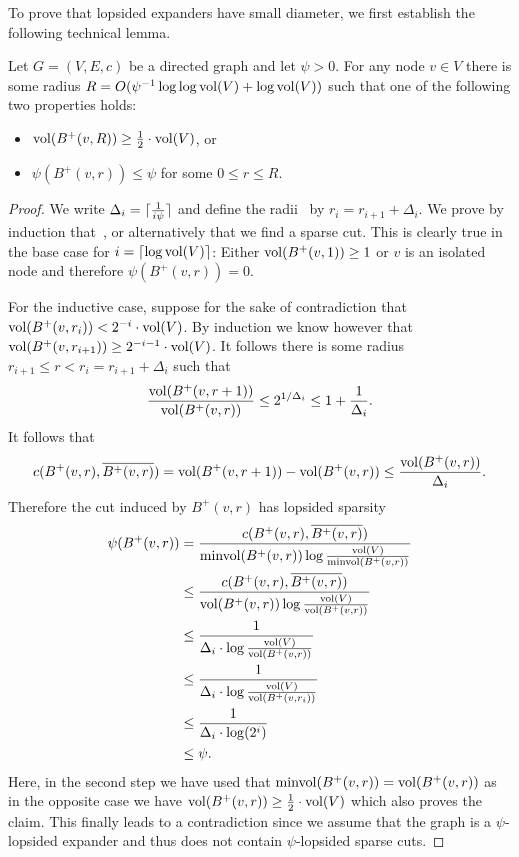 \documentclass[letterpaper,11pt]{article}
\begin{document}
To prove that lopsided expanders have small diameter, we first establish the following technical lemma. 

\begin{lemma} \label{lem:lopsided-expansion}
Let $G = (V, E, c)$ be a directed graph and let $\psi > 0$. For any node $v \in V$ there is some radius $R = O(\psi^{-1} \log\log \operatorname{vol}(V) + \log \operatorname{vol}(V))$ such that one of the following two properties holds:
\begin{itemize}
	\item $\operatorname{vol}(B^+(v, R)) \geq \frac{1}{2} \cdot \operatorname{vol}(V)$, or
	\item $\psi(B^+(v, r)) \leq \psi$ for some $0 \leq r \leq R$.
\end{itemize}
\end{lemma}
\begin{proof}
We write $\Delta_i = \lceil\frac{1}{i \psi}\rceil$ and define the radii~ by $r_i = r_{i+1} + \Delta_i$. We prove by induction that~, or alternatively that we find a sparse cut. This is clearly true in the base case for $i = \lceil\log \operatorname{vol}(V)\rceil$: Either $\operatorname{vol}(B^+(v, 1)) \geq 1$ or $v$ is an isolated node and therefore $\psi(B^+(v, r)) = 0$.

For the inductive case, suppose for the sake of contradiction that $\operatorname{vol}(B^+(v, r_i)) < 2^{-i} \cdot \operatorname{vol}(V)$. By induction we know however that $\operatorname{vol}(B^+(v, r_{i+1})) \geq 2^{-i-1} \cdot \operatorname{vol}(V)$. It follows there is some radius $r_{i+1} \leq r < r_i = r_{i+1} + \Delta_i$ such that
\begin{equation*}
	\frac{\operatorname{vol}(B^+(v, r + 1))}{\operatorname{vol}(B^+(v, r))} \leq 2^{1/\Delta_i} \leq 1 + \frac{1}{\Delta_i}.
\end{equation*}
It follows that
\begin{equation*}
	c(B^+(v, r), \overline{B^+(v, r)}) = \operatorname{vol}(B^+(v, r + 1)) - \operatorname{vol}(B^+(v, r)) \leq \frac{\operatorname{vol}(B^+(v, r))}{\Delta_i}.
\end{equation*}
Therefore the cut induced by $B^+(v, r)$ has lopsided sparsity
\begin{align*}
	\psi(B^+(v, r)) &= \frac{c(B^+(v, r), \overline{B^+(v, r)})}{\operatorname{minvol}(B^+(v, r)) \log \frac{\operatorname{vol}(V)}{\operatorname{minvol}(B^+(v, r))}} \\
	&\leq \frac{c(B^+(v, r), \overline{B^+(v, r)})}{\operatorname{vol}(B^+(v, r)) \log \frac{\operatorname{vol}(V)}{\operatorname{vol}(B^+(v, r))}} \\
	&\leq \frac{1}{\Delta_i \cdot \log \frac{\operatorname{vol}(V)}{\operatorname{vol}(B^+(v, r))}} \\
	&\leq \frac{1}{\Delta_i \cdot \log \frac{\operatorname{vol}(V)}{\operatorname{vol}(B^+(v, r_i))}} \\
	&\leq \frac{1}{\Delta_i \cdot \log(2^i)} \\
	&\leq \psi.
\end{align*}
Here, in the second step we have used that $\operatorname{minvol}(B^+(v, r)) = \operatorname{vol}(B^+(v, r))$ as in the opposite case we have $\operatorname{vol}(B^+(v, r)) \geq \frac{1}{2} \cdot \operatorname{vol}(V)$ which also proves the claim. This finally leads to a contradiction since we assume that the graph is a $\psi$-lopsided expander and thus does not contain $\psi$-lopsided sparse cuts.


\end{proof}
\end{document}
